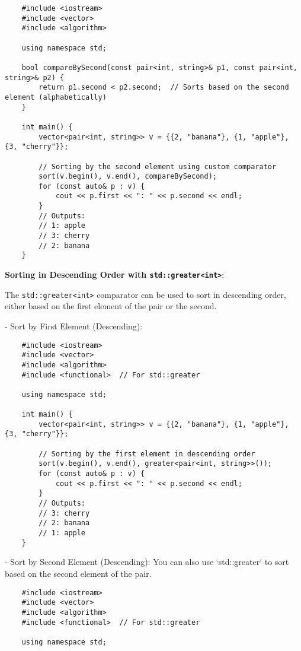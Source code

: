 \documentclass{article}
\begin{document}
\begin{enumerate}
    \begin{lstlisting}
    #include <iostream>
    #include <vector>
    #include <algorithm>

    using namespace std;

    bool compareBySecond(const pair<int, string>& p1, const pair<int, string>& p2) {
        return p1.second < p2.second;  // Sorts based on the second element (alphabetically)
    }

    int main() {
        vector<pair<int, string>> v = {{2, "banana"}, {1, "apple"}, {3, "cherry"}};

        // Sorting by the second element using custom comparator
        sort(v.begin(), v.end(), compareBySecond);
        for (const auto& p : v) {
            cout << p.first << ": " << p.second << endl;
        }
        // Outputs: 
        // 1: apple
        // 3: cherry
        // 2: banana
    }
    \end{lstlisting}

    \textbf{Sorting in Descending Order with \texttt{std::greater<int>}}:

    The \texttt{std::greater<int>} comparator can be used to sort in descending order, either based on the first element of the pair or the second.

    - Sort by First Element (Descending):
    \begin{lstlisting}
    #include <iostream>
    #include <vector>
    #include <algorithm>
    #include <functional>  // For std::greater

    using namespace std;

    int main() {
        vector<pair<int, string>> v = {{2, "banana"}, {1, "apple"}, {3, "cherry"}};

        // Sorting by the first element in descending order
        sort(v.begin(), v.end(), greater<pair<int, string>>());
        for (const auto& p : v) {
            cout << p.first << ": " << p.second << endl;
        }
        // Outputs:
        // 3: cherry
        // 2: banana
        // 1: apple
    }
    \end{lstlisting}

    - Sort by Second Element (Descending):
    You can also use `std::greater` to sort based on the second element of the pair.

    \begin{lstlisting}
    #include <iostream>
    #include <vector>
    #include <algorithm>
    #include <functional>  // For std::greater

    using namespace std;


\end{lstlisting}
\end{enumerate}
\end{document}
